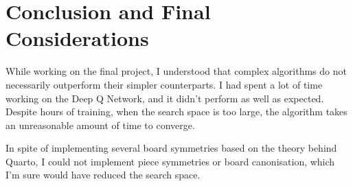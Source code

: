 \documentclass[12pt]{article}
\begin{document}






\section{Conclusion and Final Considerations}

While working on the final project, I understood that complex algorithms do not necessarily outperform their simpler counterparts. I had spent a lot of time working on the Deep Q Network, and it didn't perform as well as expected. Despite hours of training, when the search space is too large, the algorithm takes an unreasonable amount of time to converge.

In spite of implementing several board symmetries based on the theory behind Quarto, I could not implement piece symmetries or board canonisation, which I'm sure would have reduced the search space.





\newpage
% 
\end{document}
